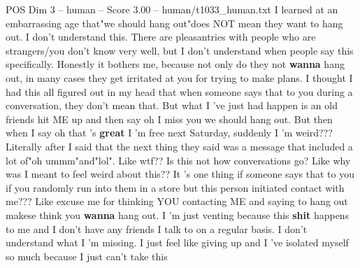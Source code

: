 \begin{textsample}{POS Dim 3 – human – Score 3.00 – human/t1033\_human.txt}  \label{ex:f3_pos_006}
I learned at an embarrassing age that"we should hang out"does NOT mean they want to hang out.
I don't understand this.
There are pleasantries with people who are strangers/you don't know very well, but I don't understand when people say this specifically.
Honestly it bothers me, because not only do they not \textbf{wanna} hang out, in many cases they get irritated at you for trying to make plans.
I thought I had this all figured out in my head that when someone says that to you during a conversation, they don't mean that.
But what I 've just had happen is an old friends hit ME up and then say oh I miss you we should hang out.
But then when I say oh that 's \textbf{great} I 'm free next Saturday, suddenly I 'm weird???
Literally after I said that the next thing they said was a message that included a lot of"oh ummm"and"lol".
Like wtf??
Is this not how conversations go?
Like why was I meant to feel weird about this??
It 's one thing if someone says that to you if you randomly run into them in a store but this person initiated contact with me???
Like excuse me for thinking YOU contacting ME and saying to hang out makese think you \textbf{wanna} hang out.
I 'm just venting because this \textbf{shit} happens to me and I don't have any friends I talk to on a regular basis.
I don't understand what I 'm missing.
I just feel like giving up and I 've isolated myself so much because I just can't take this

\end{textsample}

